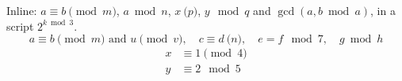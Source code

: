 \documentclass{article}
\begin{document}
Inline: $a \equiv b \pmod{m}$, $a \bmod n$, $x \pod{p}$, $y \mod{q}$ and
$\gcd(a, b \bmod a)$, in a script $2^{k \bmod 3}$.
\[
a \equiv b \pmod{m} \text{ and $u \pmod{v}$}, \quad c \equiv d \pod{n}, \quad e = f \mod{7}, \quad g \bmod h
\]
\begin{align}
x &\equiv 1 \pmod{4} \\
y &\equiv 2 \mod{5}
\end{align}
\end{document}
